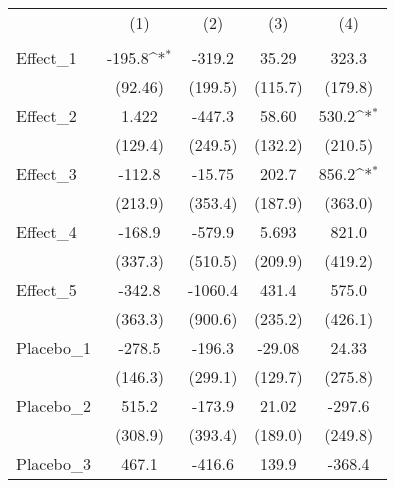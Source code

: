 {
\def\sym#1{\ifmmode^{#1}\else\(^{#1}\)\fi}
\begin{tabular}{l*{4}{c}}
\toprule
            &\multicolumn{1}{c}{(1)}&\multicolumn{1}{c}{(2)}&\multicolumn{1}{c}{(3)}&\multicolumn{1}{c}{(4)}\\
            &\multicolumn{1}{c}{} &\multicolumn{1}{c}{} &\multicolumn{1}{c}{} &\multicolumn{1}{c}{} \\
\midrule
Effect\_1    &      -195.8\sym{*}  &      -319.2         &       35.29         &       323.3         \\
            &     (92.46)         &     (199.5)         &     (115.7)         &     (179.8)         \\
\addlinespace
Effect\_2    &       1.422         &      -447.3         &       58.60         &       530.2\sym{*}  \\
            &     (129.4)         &     (249.5)         &     (132.2)         &     (210.5)         \\
\addlinespace
Effect\_3    &      -112.8         &      -15.75         &       202.7         &       856.2\sym{*}  \\
            &     (213.9)         &     (353.4)         &     (187.9)         &     (363.0)         \\
\addlinespace
Effect\_4    &      -168.9         &      -579.9         &       5.693         &       821.0         \\
            &     (337.3)         &     (510.5)         &     (209.9)         &     (419.2)         \\
\addlinespace
Effect\_5    &      -342.8         &     -1060.4         &       431.4         &       575.0         \\
            &     (363.3)         &     (900.6)         &     (235.2)         &     (426.1)         \\
\addlinespace
Placebo\_1   &      -278.5         &      -196.3         &      -29.08         &       24.33         \\
            &     (146.3)         &     (299.1)         &     (129.7)         &     (275.8)         \\
\addlinespace
Placebo\_2   &       515.2         &      -173.9         &       21.02         &      -297.6         \\
            &     (308.9)         &     (393.4)         &     (189.0)         &     (249.8)         \\
\addlinespace
Placebo\_3   &       467.1         &      -416.6         &       139.9         &      -368.4         \\

\end{tabular}}
